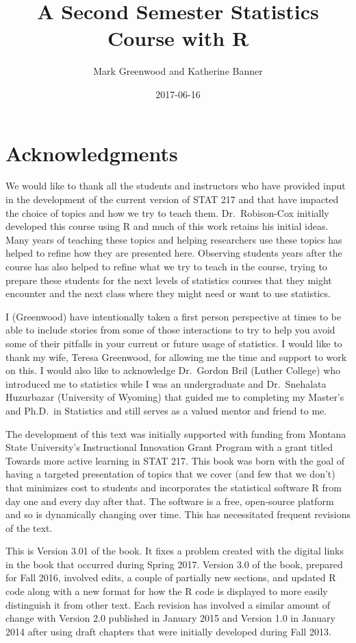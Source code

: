\documentclass[]{book}
\title{A Second Semester Statistics Course with R}
\author{Mark Greenwood and Katherine Banner}
\date{2017-06-16}
\begin{document}
\maketitle

{
\setcounter{tocdepth}{1}
\tableofcontents
}
\chapter*{Acknowledgments}\label{acknowledgments}

We would like to thank all the students and instructors who have
provided input in the development of the current version of STAT 217 and
that have impacted the choice of topics and how we try to teach them.
Dr.~Robison-Cox initially developed this course using R and much of this
work retains his initial ideas. Many years of teaching these topics and
helping researchers use these topics has helped to refine how they are
presented here. Observing students years after the course has also
helped to refine what we try to teach in the course, trying to prepare
these students for the next levels of statistics courses that they might
encounter and the next class where they might need or want to use
statistics.

I (Greenwood) have intentionally taken a first person perspective at
times to be able to include stories from some of those interactions to
try to help you avoid some of their pitfalls in your current or future
usage of statistics. I would like to thank my wife, Teresa Greenwood,
for allowing me the time and support to work on this. I would also like
to acknowledge Dr.~Gordon Bril (Luther College) who introduced me to
statistics while I was an undergraduate and Dr.~Snehalata Huzurbazar
(University of Wyoming) that guided me to completing my Master's and
Ph.D.~in Statistics and still serves as a valued mentor and friend to
me.

The development of this text was initially supported with funding from
Montana State University's Instructional Innovation Grant Program with a
grant titled Towards more active learning in STAT 217. This book was
born with the goal of having a targeted presentation of topics that we
cover (and few that we don't) that minimizes cost to students and
incorporates the statistical software R from day one and every day after
that. The software is a free, open-source platform and so is dynamically
changing over time. This has necessitated frequent revisions of the
text.

This is Version 3.01 of the book. It fixes a problem created with the
digital links in the book that occurred during Spring 2017. Version 3.0
of the book, prepared for Fall 2016, involved edits, a couple of
partially new sections, and updated R code along with a new format for
how the R code is displayed to more easily distinguish it from other
text. Each revision has involved a similar amount of change with Version
2.0 published in January 2015 and Version 1.0 in January 2014 after
using draft chapters that were initially developed during Fall 2013.
\end{document}
